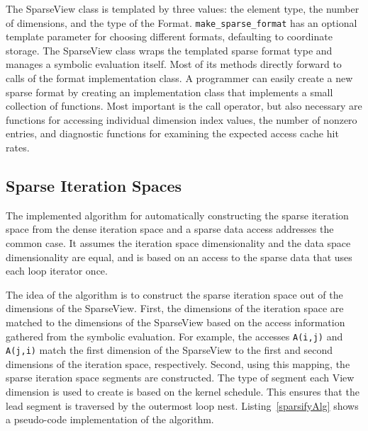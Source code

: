 The SparseView class is templated by three values: the element type, the number of dimensions, and the type of the Format.
\verb.make_sparse_format. has an optional template parameter for choosing different formats, defaulting to coordinate storage.
The SparseView class wraps the templated sparse format type and manages a symbolic evaluation itself.
Most of its methods directly forward to calls of the format implementation class.
A programmer can easily create a new sparse format by creating an implementation class that implements a small collection of functions.
Most important is the call operator, but also necessary are functions for accessing individual dimension index values, the number of nonzero entries, and diagnostic functions for examining the expected access cache hit rates.

\subsection{Sparse Iteration Spaces}

The implemented algorithm for automatically constructing the sparse iteration space from the dense iteration space and a sparse data access addresses the common case.
It assumes the iteration space dimensionality and the data space dimensionality are equal, and is based on an access to the sparse data that uses each loop iterator once.


The idea of the algorithm is to construct the sparse iteration space out of the dimensions of the SparseView. 
First, the dimensions of the iteration space are matched to the dimensions of the SparseView based on the access information gathered from the symbolic evaluation.
For example, the accesses \verb.A(i,j). and \verb.A(j,i). match the first dimension of the SparseView to the first and second dimensions of the iteration space, respectively.
Second, using this mapping, the sparse iteration space segments are constructed.
The type of segment each View dimension is used to create is based on the kernel schedule.
This ensures that the lead segment is traversed by the outermost loop nest.
Listing~\ref{sparsifyAlg} shows a pseudo-code implementation of the algorithm.


